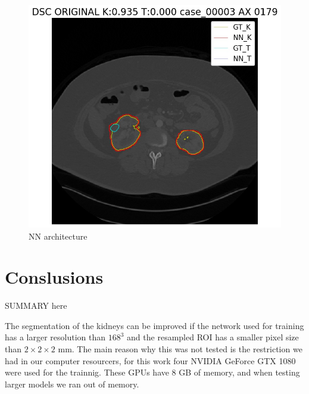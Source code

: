 \documentclass{article}
\begin{document}
\begin{figure}[h]
    \includegraphics[totalheight=.20\textheight]{imgs/ex4.jpg}
    \caption{NN architecture }
    \label{fig:res1}
\end{figure}



\section{Conslusions}
\label{sec:conlusions}
SUMMARY here

The segmentation of the kidneys can be improved if the network used for training has a larger resolution than $168^3$
and the resampled ROI has a smaller pixel size than $2 \times 2 \times 2$ mm. The main reason why this was not tested
is the restriction we had in our computer resourcers, for this work four NVIDIA GeForce GTX 1080 were used for the trainnig.
These GPUs have 8 GB of memory, and when testing larger models we ran out of memory. 

\printbibliography
\end{document}
